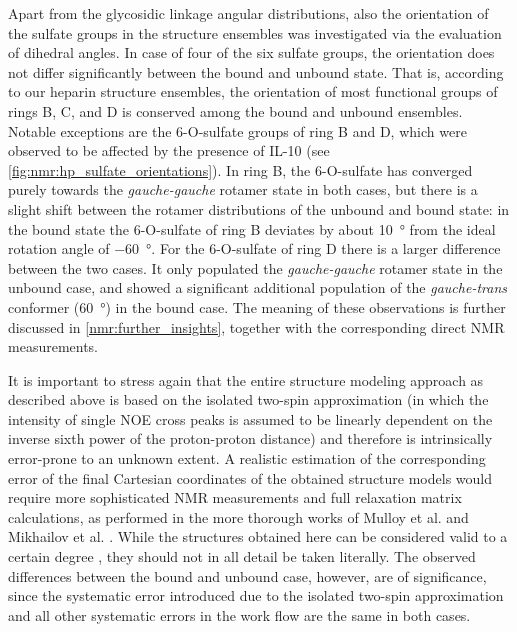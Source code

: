 Apart from the glycosidic linkage angular distributions, also the orientation of
the sulfate groups in the structure ensembles was investigated via the
evaluation of dihedral angles. In case of four of the six sulfate groups, the
orientation does not differ significantly between the bound and unbound state.
That is, according to our heparin structure ensembles, the orientation of most
functional groups of rings B, C, and D is conserved among the bound and unbound
ensembles. Notable exceptions are the 6-O-sulfate groups of ring B and D, which
were observed to be affected by the presence of IL-10 (see
\cref{fig:nmr:hp_sulfate_orientations}). In ring B, the 6-O-sulfate has
converged purely towards the \textit{gauche-gauche} rotamer state in both cases,
but there is a slight shift between the rotamer distributions of the unbound and
bound state: in the bound state the 6-O-sulfate of ring B deviates by about
\SI{10}{\degree} from the ideal rotation angle of \SI{-60}{\degree}.
For the 6-O-sulfate of ring D there is a larger difference between the two
cases. It only populated the \textit{gauche-gauche} rotamer state in the unbound
case, and showed a significant additional population of the
\textit{gauche-trans} conformer (\SI{60}{\degree}) in the bound case. The
meaning of these observations is further discussed in
\cref{nmr:further_insights}, together with the corresponding direct NMR
measurements.

%


It is important to stress again that the entire structure modeling approach as
described above is based on the isolated two-spin approximation (in which the
intensity of single NOE cross peaks is assumed to be linearly dependent on the
inverse sixth power of the proton-proton distance) and therefore is
intrinsically error-prone to an unknown extent. A realistic estimation of the
corresponding error of the final Cartesian coordinates of the obtained structure
models would require more sophisticated NMR measurements and full relaxation
matrix calculations, as performed in the more thorough works of Mulloy et al.
\cite{foster_mulloy_1993} and Mikhailov et al. \cite{mikhailov_hp_tetra_1996}.
While the structures obtained here can be considered valid to a certain degree
\cite{jones_noe_2011}, they should not in all detail be taken literally. The
observed differences between the bound and unbound case, however, are of
significance, since the systematic error introduced due to the isolated two-spin
approximation and all other systematic errors in the work flow are the same in
both cases.

